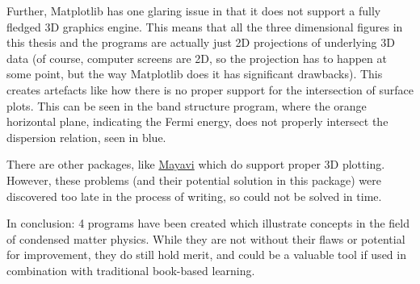 \documentclass[main.tex]{subfiles}
\begin{document}
	Further, Matplotlib has one glaring issue in that it does not support a fully fledged 3D graphics engine. This means that all the three dimensional figures in this thesis and the programs are actually just 2D projections of underlying 3D data (of course, computer screens are 2D, so the projection has to happen at some point, but the way Matplotlib does it has significant drawbacks). This creates artefacts like how there is no proper support for the intersection of surface plots. This can be seen in the band structure program, where the orange horizontal plane, indicating the Fermi energy, does not properly intersect the dispersion relation, seen in blue. 
	
	There are other packages, like \href{https://docs.enthought.com/mayavi/mayavi/}{Mayavi} which do support proper 3D plotting. However, these problems (and their potential solution in this package) were discovered too late in the process of writing, so could not be solved in time.
	
	In conclusion: 4 programs have been created which illustrate concepts in the field of condensed matter physics. While they are not without their flaws or potential for improvement, they do still hold merit, and could be a valuable tool if used in combination with traditional book-based learning.
	
\end{document}
